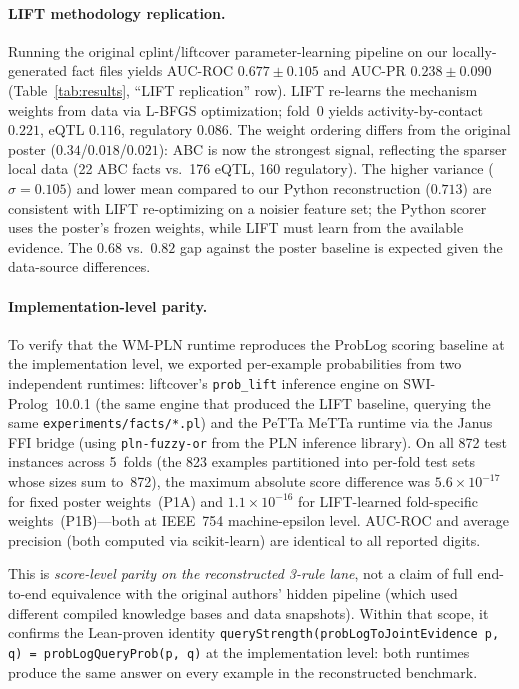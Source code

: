 \documentclass[]{article}
\newcommand{\code}[1]{\texttt{#1}}
\begin{document}
\paragraph{LIFT methodology replication.}
Running the original cplint/liftcover parameter-learning pipeline on our
locally-generated fact files yields AUC-ROC $0.677 \pm 0.105$ and AUC-PR
$0.238 \pm 0.090$ (Table~\ref{tab:results}, ``LIFT replication'' row).
LIFT re-learns the mechanism weights from data via L-BFGS optimization;
fold~0 yields activity-by-contact $0.221$, eQTL $0.116$, regulatory $0.086$.
The weight ordering differs from the original poster ($0.34$/$0.018$/$0.021$):
ABC is now the strongest signal, reflecting the sparser local data (22 ABC facts
vs.\ 176 eQTL, 160 regulatory).  The higher variance ($\sigma = 0.105$) and
lower mean compared to our Python reconstruction ($0.713$) are consistent with
LIFT re-optimizing on a noisier feature set; the Python scorer uses the
poster's frozen weights, while LIFT must learn from the available evidence.
The $0.68$ vs.\ $0.82$ gap against the poster baseline is expected given the
data-source differences.

\paragraph{Implementation-level parity.}
To verify that the WM-PLN runtime reproduces the ProbLog scoring baseline
at the implementation level,
we exported per-example probabilities from two independent runtimes:
liftcover's \code{prob\_lift} inference engine on SWI-Prolog~10.0.1
(the same engine that produced the LIFT baseline, querying the same
\code{experiments/facts/*.pl})
and the PeTTa MeTTa runtime via the Janus FFI bridge (using
\code{pln-fuzzy-or} from the PLN inference library).
On all 872 test instances across 5~folds (the 823 examples partitioned into
per-fold test sets whose sizes sum to~872), the maximum absolute score difference
was $5.6 \times 10^{-17}$ for fixed poster weights~(P1A) and
$1.1 \times 10^{-16}$ for LIFT-learned fold-specific weights~(P1B)---both
at IEEE~754 machine-epsilon level.
AUC-ROC and average precision (both computed via scikit-learn) are identical
to all reported digits.

This is \emph{score-level parity on the reconstructed 3-rule lane}, not
a claim of full end-to-end equivalence with the original authors' hidden
pipeline (which used different compiled knowledge bases and data snapshots).
Within that scope, it confirms the Lean-proven identity
\code{queryStrength(probLogToJointEvidence p, q) = probLogQueryProb(p, q)}
at the implementation level: both runtimes produce the same answer on every
example in the reconstructed benchmark.
\end{document}
